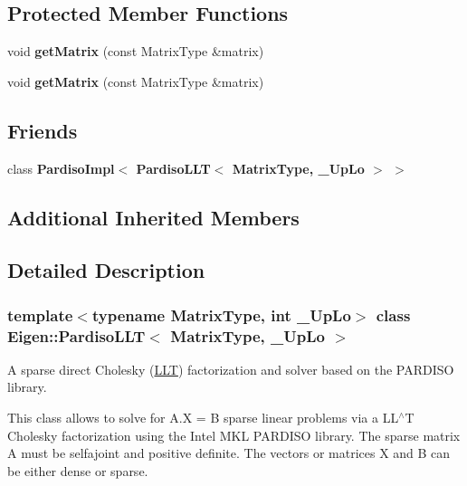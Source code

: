 \subsection*{Protected Member Functions}
\begin{DoxyCompactItemize}
\item 
\mbox{\label{class_eigen_1_1_pardiso_l_l_t_abf6ad5867c951f4ce0f407a7c6e9d560}} 
void {\bfseries get\+Matrix} (const Matrix\+Type \&matrix)
\item 
\mbox{\label{class_eigen_1_1_pardiso_l_l_t_abf6ad5867c951f4ce0f407a7c6e9d560}} 
void {\bfseries get\+Matrix} (const Matrix\+Type \&matrix)
\end{DoxyCompactItemize}
\subsection*{Friends}
\begin{DoxyCompactItemize}
\item 
\mbox{\label{class_eigen_1_1_pardiso_l_l_t_a076fbf53339403d9aa5cce02673f0abe}} 
class {\bfseries Pardiso\+Impl$<$ Pardiso\+L\+L\+T$<$ Matrix\+Type, \+\_\+\+Up\+Lo $>$ $>$}
\end{DoxyCompactItemize}
\subsection*{Additional Inherited Members}


\subsection{Detailed Description}
\subsubsection*{template$<$typename Matrix\+Type, int \+\_\+\+Up\+Lo$>$\newline
class Eigen\+::\+Pardiso\+L\+L\+T$<$ Matrix\+Type, \+\_\+\+Up\+Lo $>$}

A sparse direct Cholesky (\hyperlink{group___cholesky___module_class_eigen_1_1_l_l_t}{L\+LT}) factorization and solver based on the P\+A\+R\+D\+I\+SO library. 

This class allows to solve for A.\+X = B sparse linear problems via a L\+L$^\wedge$T Cholesky factorization using the Intel M\+KL P\+A\+R\+D\+I\+SO library. The sparse matrix A must be selfajoint and positive definite. The vectors or matrices X and B can be either dense or sparse.

